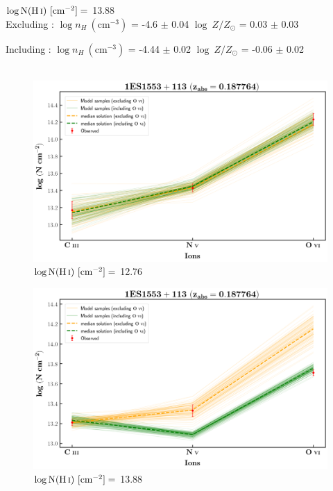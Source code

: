   $\log \text{N}(\ion{H}{i}) \ [\text{cm}^{-2}]=$ 13.88 \\
  
  Excluding  : $\log n_H \ (\text{cm}^{-3})$ = -4.6 $\pm$ 0.04 \hspace{10mm} $\log \ Z/Z_\odot$ = 0.03 $\pm$ 0.03
  
  Including  : $\log n_H \ (\text{cm}^{-3})$ = -4.44 $\pm$ 0.02 \hspace{10mm} $\log \ Z/Z_\odot$ = -0.06 $\pm$ 0.02
  \\\\
  
  
  \newpage
  
  
  \begin{figure}[!h]
      \centering
      \includegraphics[width=0.9\linewidth]{Ionisation-Modelling-Plots/1es1553-z=0.187764-compI.png}
      \caption{$\log \text{N}(\ion{H}{i}) \ [\text{cm}^{-2}]=$ 12.76}
  \end{figure}
  
  \begin{figure}[!b]
      \centering
      \includegraphics[width=0.9\linewidth]{Ionisation-Modelling-Plots/1es1553-z=0.187764-compII.png}
      \caption{$\log \text{N}(\ion{H}{i}) \ [\text{cm}^{-2}]=$ 13.88}
  \end{figure}
  
